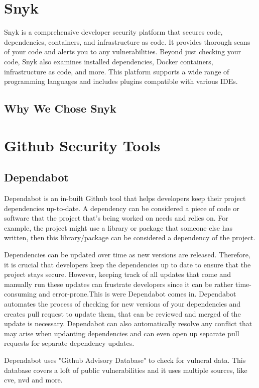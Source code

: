 \section{Snyk}
Snyk is a comprehensive developer security platform that secures code, dependencies, containers, and infrastructure as code. It provides thorough scans of your code and alerts you to any vulnerabilities. Beyond just checking your code, Snyk also examines installed dependencies, Docker containers, infrastructure as code, and more. This platform supports a wide range of programming languages and includes plugins compatible with various IDEs.\cite{snyk}
\subsection{Why We Chose Snyk}

\section{Github Security Tools}

\subsection{Dependabot}
Dependabot is an in-built Github tool that helps developers keep their project dependencies up-to-date. A dependency can be considered a piece of code or software that the project that's being worked on needs and relies on. For example, the project might use a library or package that someone else has written, then this library/package can be considered a dependency of the project. 

Dependencies can be updated over time as new versions are released. Therefore, it is crucial that developers keep the dependencies up to date to ensure that the project stays secure. However, keeping track of all updates that come and manually run these updates can frustrate developers since it can be rather time-consuming and error-prone.This is were Dependabot comes in. Dependabot automates the process of checking for new versions of your dependencies and creates pull request to update them, that can be reviewed and merged of the update is necessary. 
Dependabot can also automatically resolve any conflict that may arise when updanting dependencies and can even open up separate pull requests for separate dependency updates.  \cite{GithubDependabot2}

Dependabot uses "Github Advisory Database" to check for vulneral data. This database covers a loft of public vulnerabilities and it uses multiple sources, like \acrlong{cve}, \acrlong{nvd} and more. \cite{GithubDependabot1}
